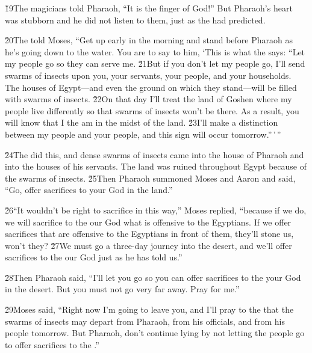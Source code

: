 \v{19}The magicians told Pharaoh, ``It is the finger of God!'' But Pharaoh's heart was stubborn and he did not listen to them, just as the  had predicted.

\v{20}The  told Moses, ``Get up early in the morning and stand before Pharaoh as he's going down to the water. You are to say to him, `This is what the  says: ``Let my people go so they can serve me. \v{21}But if you don't let my people go, I'll send swarms of insects upon you, your servants, your people, and your households. The houses of Egypt---and even the ground on which they stand---will be filled with swarms of insects. \v{22}On that day I'll treat the land of Goshen where my people live differently so that swarms of insects won't be there. As a result, you will know that I the  am in the midst of the land. \v{23}I'll make a distinction between my people and your people, and this sign will occur tomorrow.''\,'\,''

\v{24}The  did this, and dense swarms of insects came into the house of Pharaoh and into the houses of his servants. The land was ruined throughout Egypt because of the swarms of insects. \v{25}Then Pharaoh summoned Moses and Aaron and said, ``Go, offer sacrifices to your God in the land.''

\v{26}``It wouldn't be right to sacrifice in this way,'' Moses replied, ``because if we do, we will sacrifice to the  our God what is offensive to the Egyptians. If we offer sacrifices that are offensive to the Egyptians in front of them, they'll stone us, won't they? \v{27}We must go a three-day journey into the desert, and we'll offer sacrifices to the  our God just as he has told us.''

\v{28}Then Pharaoh said, ``I'll let you go so you can offer sacrifices to the  your God in the desert. But you must not go very far away. Pray for me.''

\v{29}Moses said, ``Right now I'm going to leave you, and I'll pray to the  that the swarms of insects may depart from Pharaoh, from his officials, and from his people tomorrow. But Pharaoh, don't continue lying by not letting the people go to offer sacrifices to the .''


